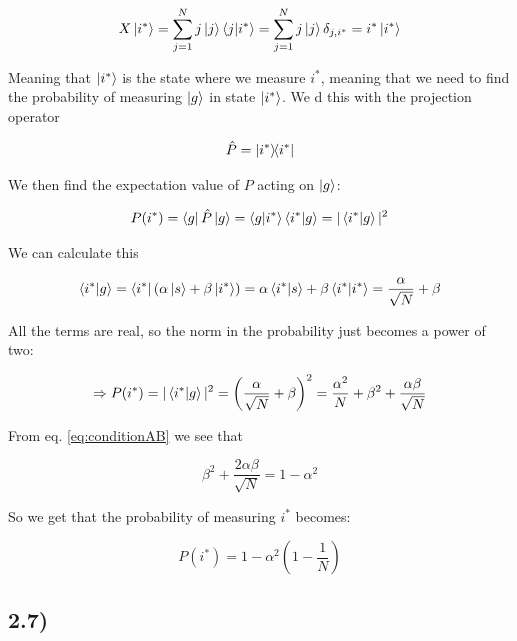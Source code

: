\documentclass[a4paper,norsk, 10pt]{article}
\begin{document}
\begin{equation}
X\ket{i^*} =\sum_{j=1}^N j\ket{j}\bra{j}\ket{i^*} = \sum_{j=1}^N j\ket{j}\delta_{j,i^*} = i^*\ket{i^*} 
\end{equation}

Meaning that $\ket{i^*}$ is the state where we measure $i^*$, meaning that we need to find the probability of measuring $\ket{g}$ in state $\ket{i^*}$. We d this with the projection operator

\begin{equation}
\hat{P} = \ketbra{i^*}{i^*}
\end{equation}

We then find the expectation value of $P$ acting on $\ket{g}$:

\begin{equation}
P(i^*) = \bra{g}\hat{P}\ket{g} = \bra{g}\ket{i^*}\bra{i^*}\ket{g} = |\braket{i^*}{g}|^2
\end{equation}

We can calculate this

\begin{equation}
\braket{i^*}{g} = \bra{i^*}(\alpha \ket{s} + \beta\ket{i^*}) = \alpha\braket{i^*}{s}+ \beta \braket{i^*}{i^*} = \frac{\alpha}{\sqrt{N}} + \beta
\end{equation}

All the terms are real, so the norm in the probability just becomes a power of two:

\begin{equation}
\Rightarrow P(i^*) = |\braket{i^*}{g}|^2 = \left(\frac{\alpha}{\sqrt{N}} + \beta\right)^2 = \frac{\alpha^2}{N} + \beta^2 + \frac{\alpha\beta}{\sqrt{N}}
\end{equation}

From eq. \eqref{eq:conditionAB} we see that

\begin{equation}
\beta^2 + \frac{2\alpha \beta}{\sqrt{N}}  = 1 - \alpha^2
\end{equation}

So we get that the probability of measuring $i^*$ becomes:

\begin{equation}
P(i^*) = 1 - \alpha^2\left(1 - \frac{1}{N}\right)
\end{equation}\label{eq:prob}

\subsection{2.7)}
\end{document}
